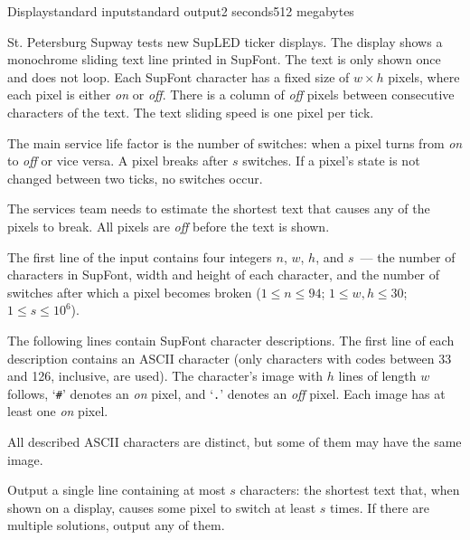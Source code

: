 \begin{problem}{Display}{standard input}{standard output}{2 seconds}{512 megabytes}

St. Petersburg Supway tests new SupLED ticker displays. The display shows a monochrome sliding text line printed in SupFont. The text is only shown once and does not loop. Each SupFont character has a fixed size of $w \times h$ pixels, where each pixel is either {\it on} or {\it off}. There is a column of {\it off} pixels between consecutive characters of the text. The text sliding speed is one pixel per tick.

The main service life factor is the number of switches: when a pixel turns from {\it on} to {\it off} or vice versa. A pixel breaks after $s$ switches. If a pixel's state is not changed between two ticks, no switches occur.

The services team needs to estimate the shortest text that causes any of the pixels to break. All pixels are {\it off} before the text is shown.

\InputFile
The first line of the input contains four integers $n$, $w$, $h$, and $s$~--- the number of characters in SupFont, width and height of each character, and the number of switches after which a pixel becomes broken ($1 \le n \le 94$; $1 \le w, h \le 30$; $1 \le s \le 10^6$).

The following lines contain SupFont character descriptions. The first line of each description contains an ASCII character (only characters with codes between 33 and 126, inclusive, are used). The character's image with $h$ lines of length $w$ follows, `\texttt{\#}' denotes an {\it on} pixel, and `\texttt{.}' denotes an {\it off} pixel. Each image has at least one {\it on} pixel.

All described ASCII characters are distinct, but some of them may have the same image.

\OutputFile
Output a single line containing at most $s$ characters: the shortest text that, when shown on a display, causes some pixel to switch at least $s$ times. If there are multiple solutions, output any of them.

\Example

\begin{example}
%
\end{example}

\end{problem}


